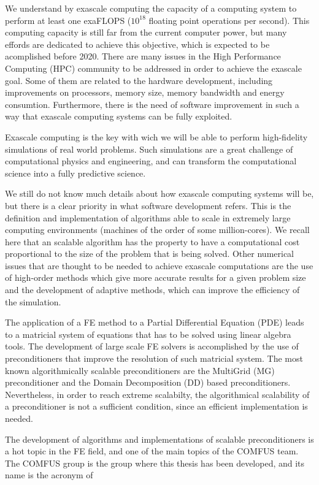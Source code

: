 We understand by exascale computing the capacity of a computing system to perform at least one exaFLOPS ($ 10^{18} $ floating point operations per second). This computing capacity is still far from the current computer power, but many effords are dedicated to achieve this objective, which is expected to be acomplished before 2020. There are many issues in the High Performance Computing (HPC) community to be addressed in order to achieve the exascale goal. Some of them are related to the hardware development, including improvements on processors, memory size, memory bandwidth and energy consumtion. Furthermore, there is the need of software improvement in such a way that exascale computing systems can be fully exploited.

Exascale computing is the key with wich we will be able to perform high-fidelity simulations of real world problems. Such simulations are a great challenge of computational physics and engineering, and can transform the computational science into a fully predictive science.

We still do not know much details about how exascale computing systems will be, but there is a clear priority in what software development refers. This is the definition and implementation of algorithms able to scale in extremely large computing environments (machines of the order of some million-cores). We recall here that an scalable algorithm has the property to have a computational cost proportional to the size of the problem that is being solved. Other numerical issues that are thought to be needed to achieve exascale computations are the use of high-order methods which give more accurate results for a given problem size and the development of adaptive methods, which can improve the efficiency of the simulation.

The application of a FE method to a Partial Differential Equation (PDE) leads to a matricial system of equations that has to be solved using linear algebra tools. The development of large scale FE solvers is accomplished by the use of preconditioners that improve the resolution of such matricial system. The most known algorithmically scalable preconditioners are the MultiGrid (MG) preconditioner and the Domain Decomposition (DD) based preconditioners. Nevertheless, in order to reach extreme scalabilty, the algorithmical scalability of a preconditioner is not a sufficient condition, since an efficient implementation is needed. 

The development of algorithms and implementations of scalable preconditioners is a hot topic in the FE field, and one of the main topics of the COMFUS team. The COMFUS group is the group where this thesis has been developed, and its name is the acronym of 

